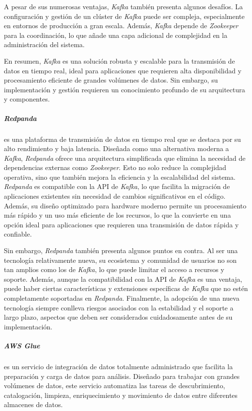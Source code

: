 A pesar de sus numerosas ventajas, \textit{Kafka} también presenta algunos
desafíos. La configuración y gestión de un clúster de \textit{Kafka} puede ser
compleja, especialmente en entornos de producción a gran escala. Además,
\textit{Kafka} depende de \textit{Zookeeper} para la coordinación, lo que añade
una capa adicional de complejidad en la administración del sistema.

En resumen, \textit{Kafka} es una solución robusta y escalable para la
transmisión de datos en tiempo real, ideal para aplicaciones que requieren alta
disponibilidad y procesamiento eficiente de grandes volúmenes de datos. Sin
embargo, su implementación y gestión requieren un conocimiento profundo de su
arquitectura y componentes.

\subparagraph{Redpanda} es una plataforma de transmisión de datos en tiempo real
que se destaca por su alto rendimiento y baja latencia. Diseñada como una
alternativa moderna a \textit{Kafka}, \textit{Redpanda} ofrece una arquitectura
simplificada que elimina la necesidad de dependencias externas como
\textit{Zookeeper}. Esto no solo reduce la complejidad operativa, sino que
también mejora la eficiencia y la escalabilidad del sistema. \textit{Redpanda}
es compatible con la API de \textit{Kafka}, lo que facilita la migración de
aplicaciones existentes sin necesidad de cambios significativos en el código.
Además, su diseño optimizado para hardware moderno permite un procesamiento más
rápido y un uso más eficiente de los recursos, lo que la convierte en una opción
ideal para aplicaciones que requieren una transmisión de datos rápida y
confiable.

Sin embargo, \textit{Redpanda} también presenta algunos puntos en contra. Al ser
una tecnología relativamente nueva, su ecosistema y comunidad de usuarios no son
tan amplios como los de \textit{Kafka}, lo que puede limitar el acceso a
recursos y soporte. Además, aunque la compatibilidad con la API de
\textit{Kafka} es una ventaja, puede haber ciertas características y extensiones
específicas de \textit{Kafka} que no estén completamente soportadas en
\textit{Redpanda}. Finalmente, la adopción de una nueva tecnología siempre
conlleva riesgos asociados con la estabilidad y el soporte a largo plazo,
aspectos que deben ser considerados cuidadosamente antes de su implementación.

\subparagraph{AWS Glue} es un servicio de integración de datos totalmente
administrado que facilita la preparación y carga de datos para análisis.
Diseñado para trabajar con grandes volúmenes de datos, este servicio
automatiza las tareas de descubrimiento, catalogación, limpieza, enriquecimiento
y movimiento de datos entre diferentes almacenes de datos.

